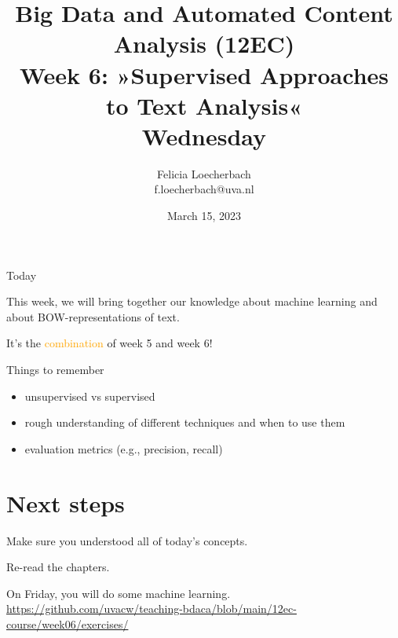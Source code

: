 \documentclass[compress]{beamer}
\begin{document}
\title[Big Data and Automated Content Analysis]{\textbf{Big Data and Automated Content Analysis (12EC)} 
\\Week 6: »Supervised Approaches to Text Analysis«
\\Wednesday}
\author[Felicia Loecherbach]{Felicia Loecherbach\\ \footnotesize{f.loecherbach@uva.nl\\}}
\date{March 15, 2023}


\begin{frame}{}
	\titlepage
\end{frame}

\begin{frame}{Today}
	\tableofcontents
\end{frame}




\begin{frame}[standout]
This week, we will bring together our knowledge about machine learning and about BOW-representations of text.

It's the \textcolor{orange}{combination} of week 5 and week 6!
\end{frame}










\begin{frame}{Things to remember}
  \begin{itemize}
  \item unsupervised vs supervised
  \item rough understanding of different techniques and when to use them
  \item evaluation metrics (e.g., precision, recall)
\end{itemize}
\end{frame}

\section{Next steps}

\begin{frame}[standout]
Make sure you understood all of today's concepts.

Re-read the chapters.

On Friday, you will do some machine learning. \large{\url{https://github.com/uvacw/teaching-bdaca/blob/main/12ec-course/week06/exercises/}}

\end{frame}

\begin{frame}
	\printbibliography
\end{frame}
\end{document}
